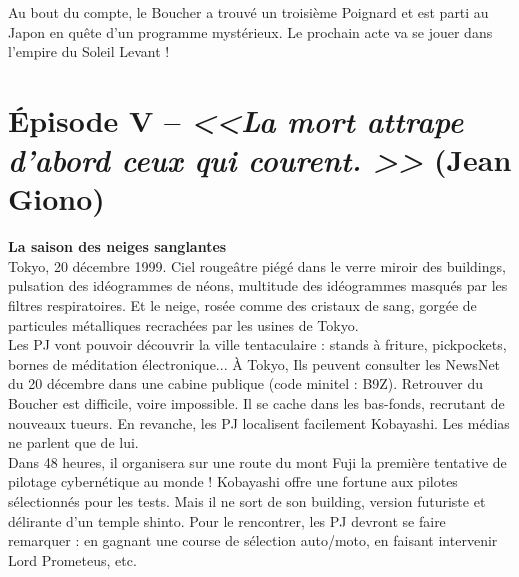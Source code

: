 \documentclass[11pt,twoside,a4paper]{book}
\begin{document}
Au bout du compte, le Boucher a trouv{\'e} un troisi{\`e}me Poignard et est parti au Japon en qu{\^e}te d'un programme myst{\'e}rieux. Le prochain acte va se jouer dans l'empire du Soleil Levant !~\\

\clearpage

\section*{{\'E}pisode V -- \emph{<<\textbf{La mort attrape d'abord ceux qui courent. }>>} (Jean Giono)}


\textbf{\large La saison des neiges sanglantes}~\\

Tokyo, 20 d{\'e}cembre 1999. Ciel rouge{\^a}tre pi{\'e}g{\'e} dans le verre miroir des buildings, pulsation des id{\'e}ogrammes de n{\'e}ons, multitude des id{\'e}ogrammes masqu{\'e}s par les filtres respiratoires. Et le neige, ros{\'e}e comme des cristaux de sang, gorg{\'e}e de particules m{\'e}talliques recrach{\'e}es par les usines de Tokyo.~\\

Les PJ vont pouvoir d{\'e}couvrir la ville tentaculaire : stands {\`a} friture, pickpockets, bornes de m{\'e}ditation {\'e}lectronique... {\`A} Tokyo, Ils peuvent consulter les NewsNet du 20 d{\'e}cembre dans une cabine publique (code minitel : B9Z). Retrouver du Boucher est difficile, voire impossible. Il se cache dans les bas-fonds, recrutant de nouveaux tueurs. En revanche, les PJ localisent facilement Kobayashi. Les m{\'e}dias ne parlent que de lui. ~\\
Dans 48 heures, il organisera sur une route du mont Fuji la premi{\`e}re tentative de pilotage cybern{\'e}tique au monde ! Kobayashi offre une fortune aux pilotes s{\'e}lectionn{\'e}s pour les tests. Mais il ne sort de son building, version futuriste et d{\'e}lirante d'un temple shinto. Pour le rencontrer, les PJ devront se faire remarquer : en gagnant une course de s{\'e}lection auto/moto, en faisant intervenir Lord Prometeus, etc.~\\
\end{document}
